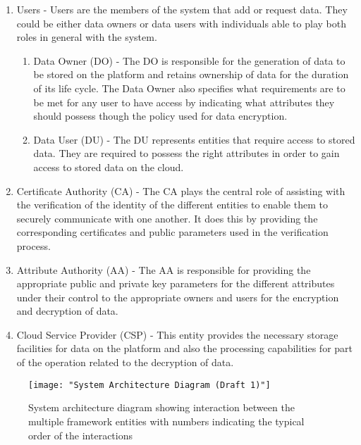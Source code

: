 \begin{enumerate}[label=(\arabic*)]
	\item Users - Users are the members of the system that add or request data. They could be either data owners or data users with individuals able to play both roles in general with the system.
	
	\begin{enumerate}
		\item Data Owner (DO) - The DO is responsible for the generation of data to be stored on the platform and retains ownership of data for the duration of its life cycle. The Data Owner also specifies what requirements are to be met for any user to have access by indicating what attributes they should possess though the policy used for data encryption.
		
		\item Data User (DU) - The DU represents entities that require access to stored data. They are required to possess the right attributes in order to gain access to stored data on the cloud.
	\end{enumerate}
	
	\item Certificate Authority (CA) - The CA plays the central role of assisting with the verification of the identity of the different entities to enable them to securely communicate with one another. It does this by providing the corresponding certificates and public parameters used in the verification process.
	
	\item Attribute Authority (AA) - The AA is responsible for providing the appropriate public and private key parameters for the different attributes under their control to the appropriate owners and users for the encryption and decryption of data. 
	
	\item Cloud Service Provider (CSP) - This entity provides the necessary storage facilities for data on the platform and also the processing capabilities for part of the operation related to the decryption of data.
	
\end{enumerate}

\begin{figure}[h]
	\centering
	\texttt{[image: "System Architecture Diagram (Draft 1)"]}
	\caption{System architecture diagram showing interaction between the multiple framework entities with numbers indicating the typical order of the interactions}
	\label{fig:sysarch}
\end{figure}

